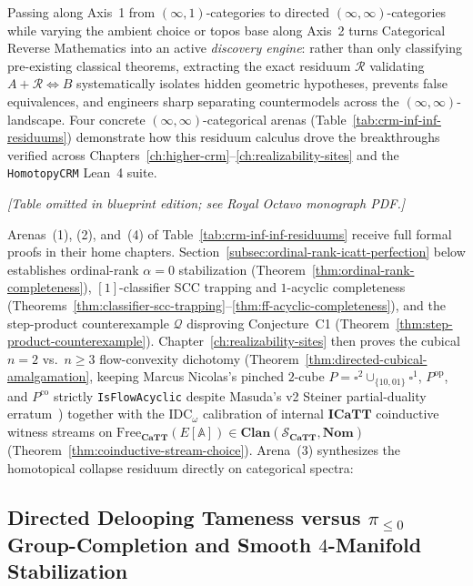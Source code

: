 Passing along Axis~1 from $(\infty, 1)$-categories to directed $(\infty, \infty)$-categories while varying the ambient choice or topos base along Axis~2 turns Categorical Reverse Mathematics into an active \emph{discovery engine}: rather than only classifying pre-existing classical theorems, extracting the exact residuum $\mathcal{R}$ validating $A + \mathcal{R} \iff B$ systematically isolates hidden geometric hypotheses, prevents false equivalences, and engineers sharp separating countermodels across the $(\infty, \infty)$-landscape. Four concrete $(\infty, \infty)$-categorical arenas (Table~\ref{tab:crm-inf-inf-residuums}) demonstrate how this residuum calculus drove the breakthroughs verified across Chapters~\ref{ch:higher-crm}--\ref{ch:realizability-sites} and the \texttt{HomotopyCRM} Lean~4 suite.

\begin{center}\emph{[Table omitted in blueprint edition; see Royal Octavo monograph PDF.]}\label{tab:crm-inf-inf-residuums}\end{center}

Arenas~(1), (2), and~(4) of Table~\ref{tab:crm-inf-inf-residuums} receive full formal proofs in their home chapters. Section~\ref{subsec:ordinal-rank-icatt-perfection} below establishes ordinal-rank $\alpha = 0$ stabilization (Theorem~\ref{thm:ordinal-rank-completeness}), $[1]$-classifier SCC trapping and $1$-acyclic completeness (Theorems~\ref{thm:classifier-scc-trapping}--\ref{thm:ff-acyclic-completeness}), and the step-product counterexample $\mathcal{Q}$ disproving Conjecture~C1 (Theorem~\ref{thm:step-product-counterexample}). Chapter~\ref{ch:realizability-sites} then proves the cubical $n = 2$ vs.\ $n \ge 3$ flow-convexity dichotomy (Theorem~\ref{thm:directed-cubical-amalgamation}, keeping Marcus Nicolas's pinched $2$-cube $P = \square^2 \cup_{\{10, 01\}} \square^1$, $P^{\mathrm{op}}$, and $P^{\mathrm{co}}$ strictly \texttt{IsFlowAcyclic} despite Masuda's v2 Steiner partial-duality erratum~\cite[\S 2.4, Footnote~5]{Masuda26}) together with the $\mathrm{IDC}_\omega$ calibration of internal $\mathbf{ICaTT}$ coinductive witness streams on $\mathrm{Free}_{\mathbf{CaTT}}(E[\mathbb{A}]) \in \mathbf{Clan}(\mathcal{S}_{\mathbf{CaTT}}, \mathbf{Nom})$ (Theorem~\ref{thm:coinductive-stream-choice}). Arena~(3) synthesizes the homotopical collapse residuum directly on categorical spectra:

\subsection*{Directed Delooping Tameness versus $\pi_{\le 0}$ Group-Completion and Smooth $4$-Manifold Stabilization}

